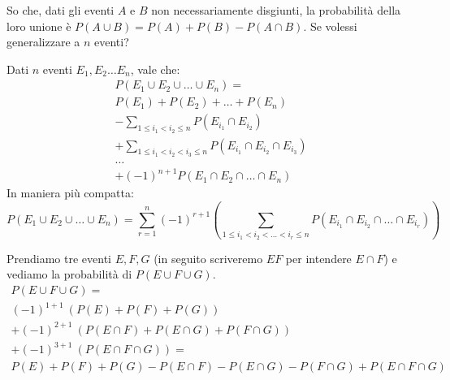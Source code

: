 So che, dati gli eventi $A$ e $B$ non necessariamente disgiunti, la probabilit\`a della loro unione \`e $P(A \cup B) = P(A) + P(B) - P(A \cap B)$. Se volessi generalizzare a $n$ eventi?

\begin{prop}
Dati $n$ eventi $E_1, E_2 \dots E_n$, vale che:
\begin{align*}
P(E_1 \cup E_2 \cup \dots \cup E_n) = \\
P(E_1) + P(E_2) + \dots + P(E_n) \\
- \sum_{1 \le i_1 < i_2 \le n} P(E_{i_1} \cap E_{i_2}) \\
+ \sum_{1 \le i_1 < i_2 < i_3 \le n} P(E_{i_1} \cap E_{i_2} \cap E_{i_3}) \\
\dots \\
+ (-1)^{n+1} P(E_1 \cap E_2 \cap \dots \cap E_n)
\end{align*}
In maniera pi\`u compatta:
\begin{equation}
P(E_1 \cup E_2 \cup \dots \cup E_n) =
\sum_{r = 1}^{n} (-1)^{r+1} 
\left(
\sum_{1 \le i_1 < i_2 < \dots < i_r \le n} P(E_{i_1} \cap E_{i_2} \cap \dots \cap E_{i_r})
\right)
\end{equation}
\end{prop}
\begin{exmp}
Prendiamo tre eventi $E, F, G$ (in seguito scriveremo $EF$ per intendere $E \cap F$) e vediamo la probabilit\`a di $P(E \cup F \cup G)$.
\begin{align*}
P(E \cup F \cup G) = \\
(-1)^{1+1} \ (P(E) + P(F) + P(G)) \\
+ (-1)^{2+1} \ (P(E \cap F) + P(E \cap G) + P(F \cap G)) \\
+ (-1)^{3+1} \ (P(E \cap F \cap G)) = \\
P(E) + P(F) + P(G) - P(E \cap F) - P(E \cap G) - P(F \cap G) + P(E \cap F \cap G)
\end{align*}
\end{exmp}
